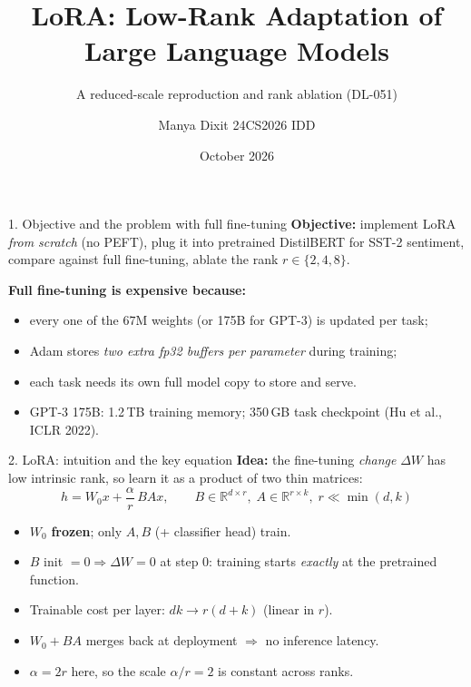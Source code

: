 \documentclass[aspectratio=169,10pt]{beamer}
\title{LoRA: Low-Rank Adaptation of Large Language Models}
\subtitle{A reduced-scale reproduction and rank ablation (DL-051)}
\author{Manya Dixit \textbullet{} 24CS2026 \textbullet{} IDD}
\date{October 2026}
\begin{document}
\begin{frame}
\titlepage
\end{frame}

\begin{frame}{1. Objective and the problem with full fine-tuning}
\textbf{Objective:} implement LoRA \emph{from scratch} (no PEFT), plug it into
pretrained DistilBERT for SST-2 sentiment, compare against full fine-tuning,
ablate the rank $r \in \{2,4,8\}$.

\textbf{Full fine-tuning is expensive because:}
\begin{itemize}
\item every one of the $67$M weights (or 175B for GPT-3) is updated per task;
\item Adam stores \emph{two extra fp32 buffers per parameter} during training;
\item each task needs its own full model copy to store and serve.
\item GPT-3 175B: 1.2\,TB training memory; 350\,GB task checkpoint
      (Hu et al., ICLR 2022).
\end{itemize}
\end{frame}

\begin{frame}{2. LoRA: intuition and the key equation}
\textbf{Idea:} the fine-tuning \emph{change} $\Delta W$ has low intrinsic
rank, so learn it as a product of two thin matrices:
\[
h = W_0 x + \frac{\alpha}{r}\,B A x,
\qquad B\in\mathbb{R}^{d\times r},\; A\in\mathbb{R}^{r\times k},\; r \ll \min(d,k)
\]
\begin{itemize}
\item $W_0$ \textbf{frozen}; only $A,B$ (+ classifier head) train.
\item $B$ init $= 0 \Rightarrow \Delta W = 0$ at step 0: training starts
      \emph{exactly} at the pretrained function.
\item Trainable cost per layer: $dk \to r(d+k)$ (linear in $r$).
\item $W_0{+}BA$ merges back at deployment $\Rightarrow$ no inference latency.
\item $\alpha = 2r$ here, so the scale $\alpha/r = 2$ is constant across ranks.
\end{itemize}
\end{frame}
\end{document}

